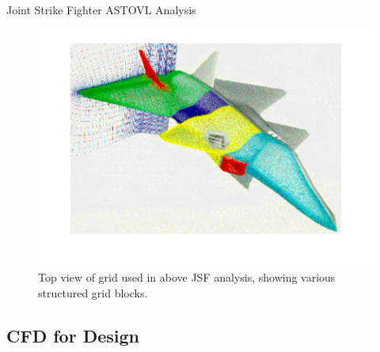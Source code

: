 \documentclass{beamer}
\begin{document}
\begin{frame}{Joint Strike Fighter ASTOVL Analysis}
  \begin{figure}
    \includegraphics[width = .7\textwidth]{JSFGrid.pdf}
    \caption{Top view of grid used in above JSF analysis, showing various structured grid blocks.}
  \end{figure}
\end{frame}

\subsection{CFD for Design}
\end{document}
